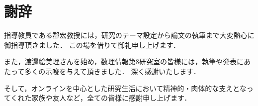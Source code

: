 \documentclass[system, bachelor]{systemB}%
\theoremstyle{break}
\begin{document}
\chapter{謝辞}%
指導教員である郡宏教授には，研究のテーマ設定から論文の執筆まで大変熱心に御指導頂きました．
この場を借りて御礼申し上げます．

また，渡邊絵美理さんを始め，数理情報第8研究室の皆様には，執筆や発表にあたって多くの示唆を与えて頂きました．
深く感謝いたします．

そして，オンラインを中心とした研究生活において精神的・肉体的な支えとなってくれた家族や友人など，全ての皆様に感謝申し上げます．

\appendix%

\end{document}
